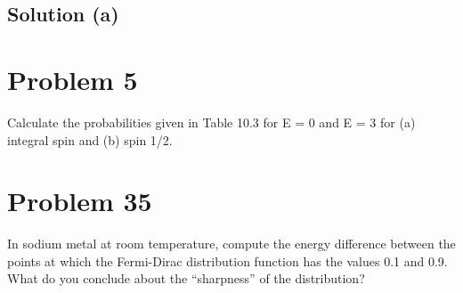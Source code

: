 \documentclass[12pt]{report}
\begin{document}
    \subsection{Solution (a)}
        
\section{Problem 5} %
    Calculate the probabilities given in Table 10.3 for E = 0 and E = 3 for (a) integral spin and (b) spin 1/2.

    \pagebreak
\section{Problem 35}
    In sodium metal at room temperature, compute the energy difference between the points at which the Fermi-Dirac distribution function has the values 0.1 and 0.9. 
    What do you conclude about the ``sharpness'' of the distribution?
\end{document}
